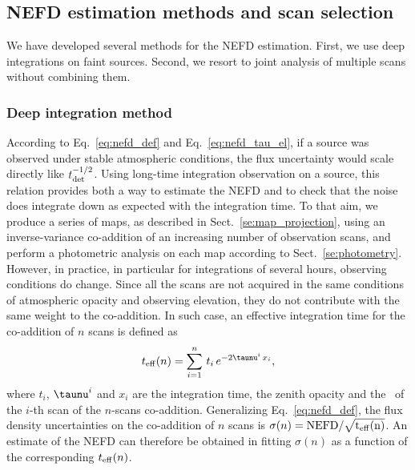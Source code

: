 \subsection{NEFD estimation methods and scan selection}
\label{se:nefd_method}

We have developed several methods for the NEFD estimation. First,
we use deep integrations on faint sources. Second, we resort to joint
analysis of multiple scans without combining them.

\subsubsection{Deep integration method}
According to Eq.~\ref{eq:nefd_def} and Eq.~\ref{eq:nefd_tau_el}, if a
source was observed under stable atmospheric conditions, the flux
uncertainty would scale directly like
$t_{\rm{det}}^{-1/2}$. Using long-time integration observation on a
source, this relation provides both a way to estimate the NEFD and to
check that the noise does integrate down as expected with the integration
time. To that aim, we produce a series of maps, as described in Sect.~\ref{se:map_projection},
using an inverse-variance co-addition of an increasing number of observation
scans, and perform a photometric analysis on each map according to
Sect.~\ref{se:photometry}. However, in practice, in particular for
integrations of several hours, observing conditions do change.
Since all the scans are not acquired in the same conditions of
atmospheric opacity and observing elevation, they
do not contribute with the same weight to the co-addition. In such
case, an effective integration time for the co-addition of $n$ scans
is defined as
%
\begin{equation}
t_{\rm{eff}}(n) = \sum_{i=1}^{n}\, t_i\,  e^{-2\taunu^i\, x_i},
\label{eq:sigma_tau_w8}
\end{equation}
%
where $t_i$, $\taunu^i$ and $x_i$ are the integration time, the zenith
opacity and the \airmass\ of the $i$-th scan of the $n$-scans
co-addition.
Generalizing Eq.~\ref{eq:nefd_def}, the flux density uncertainties on
the co-addition of $n$ scans is $\sigma(n) = \rm{NEFD}/\sqrt{t_{\rm{eff}}(n)}$.
An estimate of the
NEFD can therefore be obtained in fitting
$\sigma(n)$ as a function of the corresponding $t_{\rm{eff}}(n)$.
%
%
%

